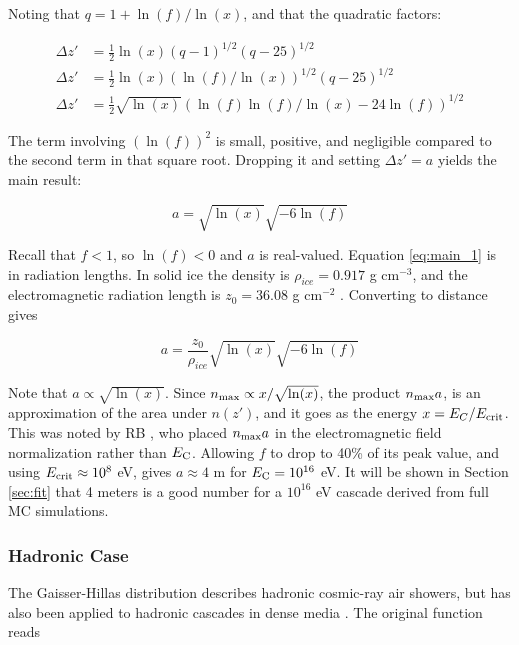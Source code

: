 \documentclass[amsmath,amssymb,aps,prd,10pt,twocolumn]{revtex4}
\begin{document}
Noting that $q = 1 + \ln(f)/\ln(x)$, and that the quadratic factors:

\begin{align}
\Delta z' &= \frac{1}{2} \ln(x) (q-1)^{1/2}(q-25)^{1/2} \\
\Delta z' &= \frac{1}{2} \ln(x) (\ln(f)/\ln(x))^{1/2}(q-25)^{1/2} \\
\Delta z' &= \frac{1}{2}\sqrt{\ln(x)} \left( \ln(f) \ln(f) / \ln(x) - 24 \ln(f) \right)^{1/2}
\end{align}

The term involving $(\ln(f))^2$ is small, positive, and negligible compared to the second term in that square root.  Dropping it and setting $\Delta z' = a$ yields the main result:

\begin{equation}
\boxed{
a = \sqrt{\ln(x)} \sqrt{-6\ln(f)}
} \label{eq:main_1}
\end{equation}

Recall that $f<1$, so $\ln(f)<0$ and $a$ is real-valued.  Equation \ref{eq:main_1} is in radiation lengths.  In solid ice the density is $\rho_{ice} = 0.917$ g cm$^{-3}$, and the electromagnetic radiation length is $z_0 = 36.08$ g cm$^{-2}$ \cite{10.1016/j.astropartphys.2017.03.008}.  Converting to distance gives 

\begin{equation}
\boxed{
a = \frac{z_0}{\rho_{ice}}\sqrt{\ln(x)}\sqrt{-6 \ln(f)}
}
\end{equation}

Note that $a \propto \sqrt{\ln(x)}$.  Since $n_{\rm max} \propto x/\sqrt{\ln(x)}$, the product $n_{\rm max} a$, is an approximation of the area under $n(z')$, and it goes as the energy $x = E_C/E_{\rm crit}$.  This was noted by RB \cite{10.1103/physrevd.65.016003}, who placed $n_{\rm max} a$ in the electromagnetic field normalization rather than $E_{\rm C}$.  Allowing $f$ to drop to 40\% of its peak value, and using $E_{\rm crit} \approx 10^8$ eV, gives $a \approx 4$ m for $E_{\rm C} = 10^{16}$ eV.  It will be shown in Section \ref{sec:fit} that 4 meters is a good number for a $10^{16}$ eV cascade derived from full MC simulations.

\subsubsection{Hadronic Case}

The Gaisser-Hillas distribution describes hadronic cosmic-ray air showers, but has also been applied to hadronic cascades in dense media \cite{testbed}.  The original function reads
\end{document}
